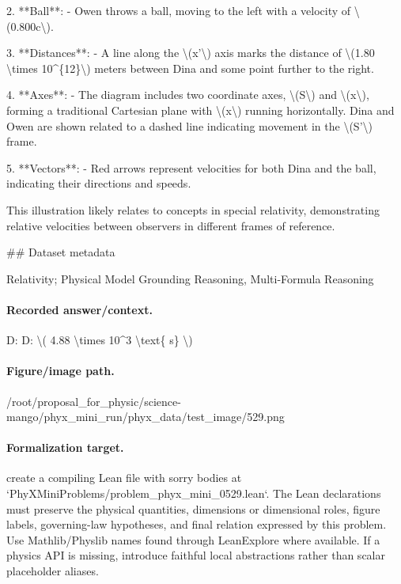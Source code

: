 2. **Ball**:
   - Owen throws a ball, moving to the left with a velocity of \textbackslash{}(0.800c\textbackslash{}).

3. **Distances**:
   - A line along the \textbackslash{}(x'\textbackslash{}) axis marks the distance of \textbackslash{}(1.80 \textbackslash{}times 10\textasciicircum{}\{12\}\textbackslash{}) meters between Dina and some point further to the right.

4. **Axes**:
   - The diagram includes two coordinate axes, \textbackslash{}(S\textbackslash{}) and \textbackslash{}(x\textbackslash{}), forming a traditional Cartesian plane with \textbackslash{}(x\textbackslash{}) running horizontally. Dina and Owen are shown related to a dashed line indicating movement in the \textbackslash{}(S'\textbackslash{}) frame.

5. **Vectors**:
   - Red arrows represent velocities for both Dina and the ball, indicating their directions and speeds.

This illustration likely relates to concepts in special relativity, demonstrating relative velocities between observers in different frames of reference.

\#\# Dataset metadata

Relativity; Physical Model Grounding Reasoning, Multi-Formula Reasoning

\paragraph{Recorded answer/context.}
D: D: \textbackslash{}( 4.88 \textbackslash{}times 10\textasciicircum{}3 \textbackslash{}text\{ s\} \textbackslash{})

\paragraph{Figure/image path.}
/root/proposal\_for\_physic/science-mango/phyx\_mini\_run/phyx\_data/test\_image/529.png

\paragraph{Formalization target.}
create a compiling Lean file with sorry bodies at `PhyXMiniProblems/problem\_phyx\_mini\_0529.lean`. The Lean declarations must preserve the physical quantities, dimensions or dimensional roles, figure labels, governing-law hypotheses, and final relation expressed by this problem.
Use Mathlib/Physlib names found through LeanExplore where available. If a physics API is missing, introduce faithful local abstractions rather than scalar placeholder aliases.

